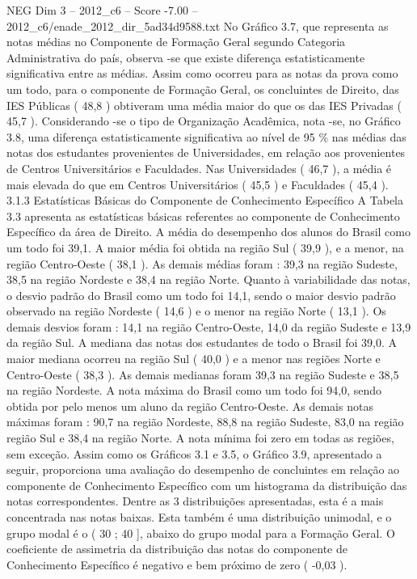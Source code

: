 \begin{textsample}{NEG Dim 3 – 2012\_c6 – Score -7.00 – 2012\_c6/enade\_2012\_dir\_5ad34d9588.txt}
No Gráfico 3.7, que representa as notas médias no Componente de Formação Geral segundo Categoria Administrativa do país, observa -se que existe diferença estatisticamente significativa entre as médias.
Assim como ocorreu para as notas da prova como um todo, para o componente de Formação Geral, os concluintes de Direito, das IES Públicas ( 48,8 ) obtiveram uma média maior do que os das IES Privadas ( 45,7 ).
Considerando -se o tipo de Organização Acadêmica, nota -se, no Gráfico 3.8, uma diferença estatisticamente significativa ao nível de 95 \% nas médias das notas dos estudantes provenientes de Universidades, em relação aos provenientes de Centros Universitários e Faculdades.
Nas Universidades ( 46,7 ), a média é mais elevada do que em Centros Universitários ( 45,5 ) e Faculdades ( 45,4 ). 3.1.3 Estatísticas Básicas do Componente de Conhecimento Específico A Tabela 3.3 apresenta as estatísticas básicas referentes ao componente de Conhecimento Específico da área de Direito.
A média do desempenho dos alunos do Brasil como um todo foi 39,1.
A maior média foi obtida na região Sul ( 39,9 ), e a menor, na região Centro-Oeste ( 38,1 ).
As demais médias foram : 39,3 na região Sudeste, 38,5 na região Nordeste e 38,4 na região Norte.
Quanto à variabilidade das notas, o desvio padrão do Brasil como um todo foi 14,1, sendo o maior desvio padrão observado na região Nordeste ( 14,6 ) e o menor na região Norte ( 13,1 ).
Os demais desvios foram : 14,1 na região Centro-Oeste, 14,0 da região Sudeste e 13,9 da região Sul.
A mediana das notas dos estudantes de todo o Brasil foi 39,0.
A maior mediana ocorreu na região Sul ( 40,0 ) e a menor nas regiões Norte e Centro-Oeste ( 38,3 ).
As demais medianas foram 39,3 na região Sudeste e 38,5 na região Nordeste.
A nota máxima do Brasil como um todo foi 94,0, sendo obtida por pelo menos um aluno da região Centro-Oeste.
As demais notas máximas foram : 90,7 na região Nordeste, 88,8 na região Sudeste, 83,0 na região região Sul e 38,4 na região Norte.
A nota mínima foi zero em todas as regiões, sem exceção.
Assim como os Gráficos 3.1 e 3.5, o Gráfico 3.9, apresentado a seguir, proporciona uma avaliação do desempenho de concluintes em relação ao componente de Conhecimento Específico com um histograma da distribuição das notas correspondentes.
Dentre as 3 distribuições apresentadas, esta é a mais concentrada nas notas baixas.
Esta também é uma distribuição unimodal, e o grupo modal é o ( 30 ; 40 ], abaixo do grupo modal para a Formação Geral.
O coeficiente de assimetria da distribuição das notas do componente de Conhecimento Específico é negativo e bem próximo de zero ( -0,03 ).

\end{textsample}
